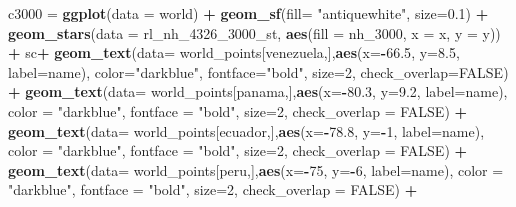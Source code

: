\documentclass[12pt,twoside]{reedthesis}
\newenvironment{Shaded}{\begin{snugshade}}{\end{snugshade}}
\newcommand{\DataTypeTok}[1]{\textcolor[rgb]{0.13,0.29,0.53}{#1}}
\newcommand{\DecValTok}[1]{\textcolor[rgb]{0.00,0.00,0.81}{#1}}
\newcommand{\FloatTok}[1]{\textcolor[rgb]{0.00,0.00,0.81}{#1}}
\newcommand{\KeywordTok}[1]{\textcolor[rgb]{0.13,0.29,0.53}{\textbf{#1}}}
\newcommand{\NormalTok}[1]{#1}
\newcommand{\OperatorTok}[1]{\textcolor[rgb]{0.81,0.36,0.00}{\textbf{#1}}}
\newcommand{\OtherTok}[1]{\textcolor[rgb]{0.56,0.35,0.01}{#1}}
\newcommand{\StringTok}[1]{\textcolor[rgb]{0.31,0.60,0.02}{#1}}
\begin{document}
\begin{Shaded}
\begin{Highlighting}[]
\NormalTok{c3000 =}\StringTok{ }\KeywordTok{ggplot}\NormalTok{(}\DataTypeTok{data =}\NormalTok{ world) }\OperatorTok{+}\StringTok{ }
\StringTok{  }\KeywordTok{geom_sf}\NormalTok{(}\DataTypeTok{fill=} \StringTok{"antiquewhite"}\NormalTok{, }\DataTypeTok{size=}\FloatTok{0.1}\NormalTok{) }\OperatorTok{+}\StringTok{ }
\StringTok{  }\KeywordTok{geom_stars}\NormalTok{(}\DataTypeTok{data =}\NormalTok{ rl_nh_}\DecValTok{4326}\NormalTok{_}\DecValTok{3000}\NormalTok{_st, }\KeywordTok{aes}\NormalTok{(}\DataTypeTok{fill =}\NormalTok{ nh_}\DecValTok{3000}\NormalTok{, }\DataTypeTok{x =}\NormalTok{ x, }\DataTypeTok{y =}\NormalTok{ y)) }\OperatorTok{+}\StringTok{ }
\StringTok{  }\NormalTok{sc}\OperatorTok{+}
\StringTok{  }\KeywordTok{geom_text}\NormalTok{(}\DataTypeTok{data=}\NormalTok{ world_points[venezuela,],}\KeywordTok{aes}\NormalTok{(}\DataTypeTok{x=}\OperatorTok{-}\FloatTok{66.5}\NormalTok{, }\DataTypeTok{y=}\FloatTok{8.5}\NormalTok{, }\DataTypeTok{label=}\NormalTok{name), }\DataTypeTok{color=}\StringTok{"darkblue"}\NormalTok{, }\DataTypeTok{fontface=}\StringTok{"bold"}\NormalTok{, }\DataTypeTok{size=}\DecValTok{2}\NormalTok{, }\DataTypeTok{check_overlap=}\OtherTok{FALSE}\NormalTok{) }\OperatorTok{+}
\StringTok{  }\KeywordTok{geom_text}\NormalTok{(}\DataTypeTok{data=}\NormalTok{ world_points[panama,],}\KeywordTok{aes}\NormalTok{(}\DataTypeTok{x=}\OperatorTok{-}\FloatTok{80.3}\NormalTok{, }\DataTypeTok{y=}\FloatTok{9.2}\NormalTok{, }\DataTypeTok{label=}\NormalTok{name), }\DataTypeTok{color =} \StringTok{"darkblue"}\NormalTok{, }\DataTypeTok{fontface =} \StringTok{"bold"}\NormalTok{, }\DataTypeTok{size=}\DecValTok{2}\NormalTok{, }\DataTypeTok{check_overlap =} \OtherTok{FALSE}\NormalTok{) }\OperatorTok{+}\StringTok{ }
\StringTok{  }\KeywordTok{geom_text}\NormalTok{(}\DataTypeTok{data=}\NormalTok{ world_points[ecuador,],}\KeywordTok{aes}\NormalTok{(}\DataTypeTok{x=}\OperatorTok{-}\FloatTok{78.8}\NormalTok{, }\DataTypeTok{y=}\OperatorTok{-}\DecValTok{1}\NormalTok{, }\DataTypeTok{label=}\NormalTok{name), }\DataTypeTok{color =} \StringTok{"darkblue"}\NormalTok{, }\DataTypeTok{fontface =} \StringTok{"bold"}\NormalTok{, }\DataTypeTok{size=}\DecValTok{2}\NormalTok{, }\DataTypeTok{check_overlap =} \OtherTok{FALSE}\NormalTok{) }\OperatorTok{+}
\StringTok{  }\KeywordTok{geom_text}\NormalTok{(}\DataTypeTok{data=}\NormalTok{ world_points[peru,],}\KeywordTok{aes}\NormalTok{(}\DataTypeTok{x=}\OperatorTok{-}\DecValTok{75}\NormalTok{, }\DataTypeTok{y=}\OperatorTok{-}\DecValTok{6}\NormalTok{, }\DataTypeTok{label=}\NormalTok{name), }\DataTypeTok{color =} \StringTok{"darkblue"}\NormalTok{, }\DataTypeTok{fontface =} \StringTok{"bold"}\NormalTok{, }\DataTypeTok{size=}\DecValTok{2}\NormalTok{, }\DataTypeTok{check_overlap =} \OtherTok{FALSE}\NormalTok{) }\OperatorTok{+}

\end{Highlighting}
\end{Shaded}
\end{document}
